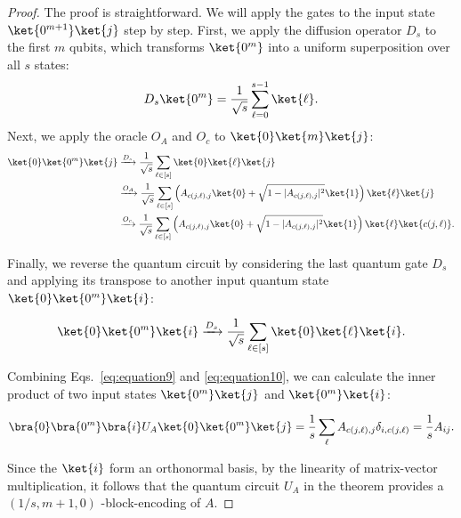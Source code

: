 \documentclass{article}
\begin{document}
    \begin{proof}
        The proof is straightforward. We will apply the gates to the input state $\ket{0^{m+1}}\ket{j}$ step by step.
        First, we apply the diffusion operator $D_s$ to the first $m$ qubits, which transforms $\ket{0^m}$ into a uniform superposition over all $s$ states:
        \begin{equation}
            D_s \ket{0^m} = \frac{1}{\sqrt{s}} \sum_{\ell=0}^{s-1} \ket{\ell}.\label{eq:equation8}
        \end{equation}
        Next, we apply the oracle $O_A$ and $O_c$ to $\ket{0}\ket{m}\ket{j}$:
        \begin{equation}
            \begin{aligned}
                \ket{0} \ket{0^m} \ket{j}
                &\xrightarrow{D_s} \frac{1}{\sqrt{s}} \sum_{\ell \in [s]} \ket{0} \ket{\ell} \ket{j} \\
                &\xrightarrow{O_A} \frac{1}{\sqrt{s}} \sum_{\ell \in [s]} \left( A_{c(j, \ell), j} \ket{0} + \sqrt{1 - |A_{c(j, \ell), j}|^2} \ket{1} \right) \ket{\ell} \ket{j} \\
                &\xrightarrow{O_c} \frac{1}{\sqrt{s}} \sum_{\ell \in [s]} \left( A_{c(j, \ell), j} \ket{0} + \sqrt{1 - |A_{c(j, \ell), j}|^2} \ket{1} \right) \ket{\ell} \ket{c(j, \ell)}.
            \end{aligned}\label{eq:equation9}
        \end{equation}

        Finally, we reverse the quantum circuit by considering the last quantum gate $D_s$ and applying its transpose to another input quantum state $\ket{0}\ket{0^m}\ket{i}$:

        \begin{equation}
            \ket{0} \ket{0^m} \ket{i}
            \xrightarrow{D_s} \frac{1}{\sqrt{s}} \sum_{\ell \in [s]} \ket{0} \ket{\ell} \ket{i}\label{eq:equation10}.
        \end{equation}

        Combining Eqs.~\eqref{eq:equation9} and \eqref{eq:equation10}, we can calculate the inner product of two input states $\ket{0^m}\ket{j}$ and $\ket{0^m}\ket{i}$:

        \begin{equation}
            \bra{0} \bra{0^m} \bra{i} U_A \ket{0} \ket{0^m} \ket{j}
            = \frac{1}{s} \sum_{\ell} A_{c(j, \ell), j} \delta_{i, c(j, \ell)}
            = \frac{1}{s} A_{ij}.\label{eq:equation11}
        \end{equation}

        Since the $\ket{i}$ form an orthonormal basis, by the linearity of matrix-vector multiplication, it follows that the quantum circuit $U_A$ in the theorem provides a $(1/s,m+1,0)$ -block-encoding of $A$.

    \end{proof}
\end{document}
